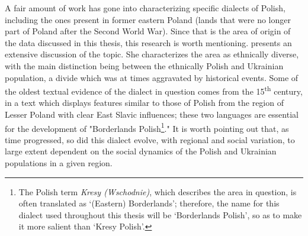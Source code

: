 A fair amount of work has gone into characterizing specific dialects of Polish, including the ones present in former eastern Poland (lands that were no longer part of Poland after the Second World War). Since that is the area of origin of the data discussed in this thesis, this research is worth mentioning. \citet{kurzowa_1983} presents an extensive discussion of the topic. She characterizes the area as ethnically diverse, with the main distinction being between the ethnically Polish and Ukrainian population, a divide which was at times aggravated by historical events. Some of the oldest textual evidence of the dialect in question comes from the 15\textsuperscript{th} century, in a text which displays features similar to those of Polish from the region of Lesser Poland with clear East Slavic influences; these two languages are essential for the development of "Borderlands Polish\footnote{The Polish term \textit{Kresy (Wschodnie)}, which describes the area in question, is often translated as `(Eastern) Borderlands'; therefore, the name for this dialect used throughout this thesis will be `Borderlands Polish', so as to make it more salient than `Kresy Polish'.}." It is worth pointing out that, as time progressed, so did this dialect evolve, with regional and social variation, to large extent dependent on the social dynamics of the Polish and Ukrainian populations in a given region. 

